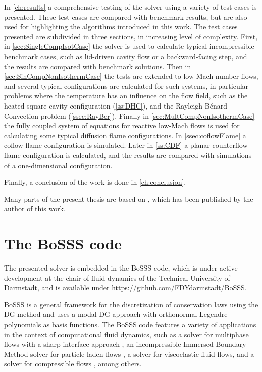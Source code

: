 In \cref{ch:results} a comprehensive testing of the solver using a variety of test cases is presented. These test cases are compared with benchmark results, but are also used for highlighting the algorithms introduced in this work. The test cases presented are subdivided in three sections, in increasing level of complexity. First, in \cref{sec:SingleCompIsotCase} the solver is used to calculate typical incompressible benchmark cases, such as lid-driven cavity flow or a backward-facing step, and the results are compared with benchmark solutions. Then in \cref{sec:SinCompNonIsothermCase} the tests are extended to low-Mach number flows, and several typical configurations are calculated for such systems, in particular problems where the temperature has an influence on the flow field, such as the heated square cavity configuration (\cref{ss:DHC}), and the Rayleigh-Bénard Convection problem (\cref{ssec:RayBer}).
Finally in \cref{sec:MultCompNonIsothermCase} the fully coupled system of equations for reactive low-Mach flows is used for calculating some typical diffusion flame configurations. In \cref{ssec:coflowFlame} a coflow flame configuration is simulated. Later in \cref{ss:CDF} a planar counterflow flame configuration is calculated, and the results are compared with simulations of a one-dimensional configuration. 

Finally, a conclusion of the work is done in \cref{ch:conclusion}.


Many parts of the present thesis are based on \textcite{gutierrez-jorqueraFullyCoupledHigh2022}, which has been published by the author of this work.


\section{The BoSSS code}
The presented solver is embedded in the \gls{BoSSS} code, which is under active development at the chair of fluid dynamics of the Technical University of Darmstadt, and is available under \href{https://github.com/FDYdarmstadt/BoSSS}{https://github.com/FDYdarmstadt/BoSSS}.

BoSSS is a general framework for the discretization of conservation laws using the DG method and uses a modal DG approach with orthonormal Legendre polynomials as basis functions. The BoSSS code features a variety of applications in the context of computational fluid dynamics, such as a solver for multiphase flows with a sharp interface approach \parencite{kummerExtendedDiscontinuousGalerkin2017}, an incompressible Immersed Boundary Method solver for particle laden flows \parencite{krauseIncompressibleImmersedBoundary2017}, a solver for viscoelastic fluid flows\parencite{kikkerFullyCoupledHighorder}, and a solver for compressible flows \parencite{geisenhoferDiscontinuousGalerkinImmersed2019}, among others.

